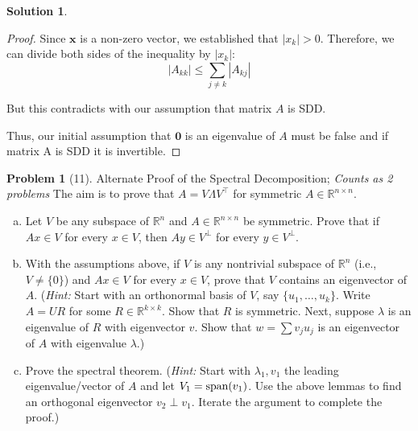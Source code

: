 \documentclass{amsart}[11pt]
\theoremstyle{definition}
\newtheorem*{problem}{Problem}
\newtheorem*{solution}{Solution}
\newcommand{\R}{\mathbb{R}}
\newcommand{\sspan}{\textnormal{span}}
\begin{document}
\begin{solution}
\begin{proof}
        Since $\mathbf{x}$ is a non-zero vector, we established that $|x_k| > 0$. Therefore, we can divide both sides of the inequality by $|x_k|$:
        $$|A_{kk}| \leq \sum_{j \neq k} |A_{kj}|$$

        But this contradicts with our assumption that matrix $A$ is SDD.

        Thus, our initial assumption that $\mathbf{0}$ is an eigenvalue of $A$ must be false and if matrix A is SDD it is  invertible.


    \end{proof}

\end{solution}

\begin{problem}[11]Alternate Proof of the Spectral Decomposition; \textit{Counts as 2 problems}
The aim is to prove that $A = V\Lambda V^\top$ for symmetric $A\in\R^{n\times n}$.
\begin{enumerate}[(a)]
\item Let $V$ be any subspace of $\R^n$ and $A\in\R^{n\times n}$ be symmetric. Prove that if $Ax\in V$ for every $x\in V$, then $Ay\in V^\perp$ for every $y\in V^\perp$.
\item With the assumptions above, if $V$ is any nontrivial subspace of $\R^n$ (i.e., $V\neq \{0\}$) and $Ax\in V$ for every $x\in V$, prove that $V$ contains an eigenvector of $A$. (\textit{Hint:} Start with an orthonormal basis of $V$, say $\{u_1,\dots,u_k\}$. Write $A = UR$ for some $R\in\R^{k\times k}$. Show that $R$ is symmetric. Next, suppose $\lambda$ is an eigenvalue of $R$ with eigenvector $v$. Show that $w  = \sum v_ju_j$ is an eigenvector of $A$ with eigenvalue $\lambda$.)
\item Prove the spectral theorem. (\textit{Hint:} Start with $\lambda_1, v_1$ the leading eigenvalue/vector of $A$ and let $V_1 = \sspan(v_1)$. Use the above lemmas to find an orthogonal eigenvector $v_2\perp v_1$. Iterate the argument to complete the proof.)
\end{enumerate}
\end{problem}
\end{document}
